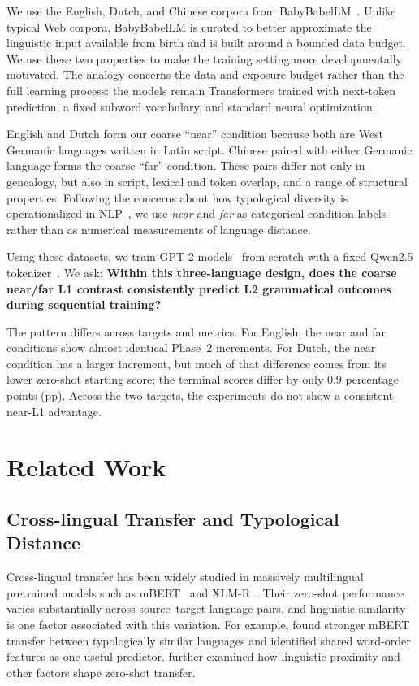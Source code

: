\documentclass[11pt]{article}
\begin{document}
We use the English, Dutch, and Chinese corpora from BabyBabelLM~\citep{jumelet-etal-2026-babybabellm}. Unlike typical Web corpora, BabyBabelLM is curated to better approximate the linguistic input available from birth and is built around a bounded data budget. We use these two properties to make the training setting more developmentally motivated. The analogy concerns the data and exposure budget rather than the full learning process: the models remain Transformers trained with next-token prediction, a fixed subword vocabulary, and standard neural optimization.

English and Dutch form our coarse ``near'' condition because both are West Germanic languages written in Latin script. Chinese paired with either Germanic language forms the coarse ``far'' condition. These pairs differ not only in genealogy, but also in script, lexical and token overlap, and a range of structural properties. Following the concerns about how typological diversity is operationalized in NLP~\citep{ploeger-etal-2026-principled}, we use \emph{near} and \emph{far} as categorical condition labels rather than as numerical measurements of language distance.

Using these datasets, we train GPT-2 models~\citep{Radford2019LanguageMA} from scratch with a fixed Qwen2.5 tokenizer~\citep{qwen2025qwen25technicalreport}. We ask: \textbf{Within this three-language design, does the coarse near/far L1 contrast consistently predict L2 grammatical outcomes during sequential training?}

The pattern differs across targets and metrics. For English, the near and far conditions show almost identical Phase~2 increments. For Dutch, the near condition has a larger increment, but much of that difference comes from its lower zero-shot starting score; the terminal scores differ by only 0.9 percentage points (pp). Across the two targets, the experiments do not show a consistent near-L1 advantage.

\section{Related Work}

\subsection{Cross-lingual Transfer and Typological Distance}

Cross-lingual transfer has been widely studied in massively multilingual pretrained models such as mBERT~\citep{devlin2019bertpretrainingdeepbidirectional} and XLM-R~\citep{conneau-etal-2020-unsupervised}. Their zero-shot performance varies substantially across source--target language pairs, and linguistic similarity is one factor associated with this variation. For example, \citet{pires-etal-2019-multilingual} found stronger mBERT transfer between typologically similar languages and identified shared word-order features as one useful predictor. \citet{lauscher-etal-2020-zero} further examined how linguistic proximity and other factors shape zero-shot transfer.
\end{document}
